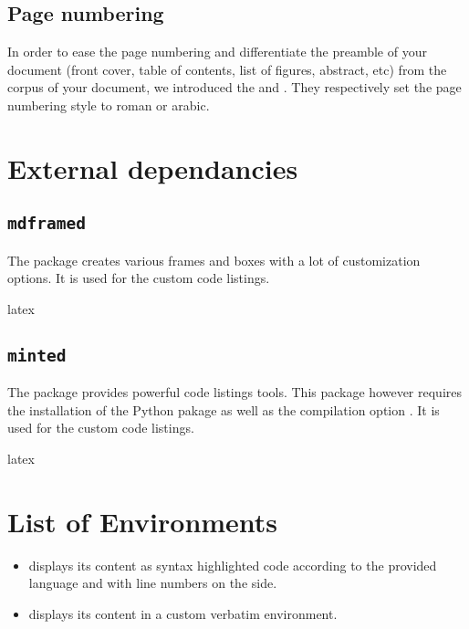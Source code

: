 \documentclass{report}
\begin{document}
\subsection{Page numbering}
In order to ease the page numbering and differentiate the preamble of your document (front cover, table of contents, list of figures, abstract, etc) from the corpus of your document, we introduced the  and . They respectively set the page numbering style to roman or arabic.


\section{External dependancies}


\subsection{\texttt{mdframed}}
The  package creates various frames and boxes with a lot of customization options. It is used for the custom code listings.

\begin{imtaCode}{latex}
    \RequirePackage{mdframed}
\end{imtaCode}


\subsection{\texttt{minted}}
The  package provides powerful code listings tools. This package however requires the installation of the Python pakage  as well as the compilation option . It is used for the custom code listings.

\begin{imtaCode}{latex}
    \RequirePackage{minted}
\end{imtaCode}



\section{List of Environments}
\begin{itemize}
    \item {} displays its content as syntax highlighted code according to the provided language and with line numbers on the side. 
    \item {} displays its content in a custom verbatim environment.
\end{itemize}
\end{document}

